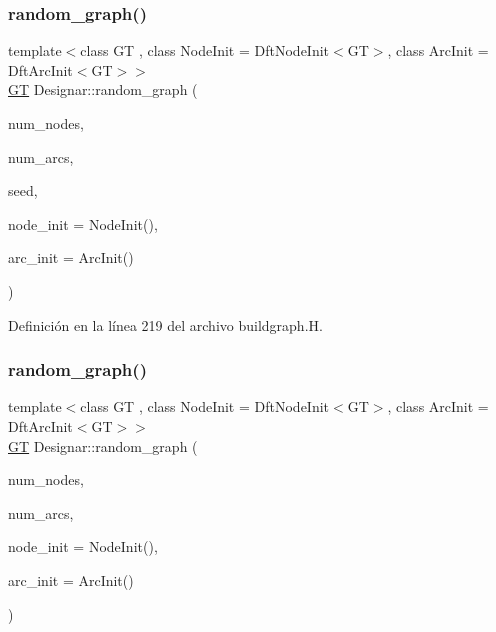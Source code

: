 \subsubsection{\texorpdfstring{random\+\_\+graph()}{random\_graph()}\hspace{0.1cm}{\footnotesize\ttfamily [2/3]}}
{\footnotesize\ttfamily template$<$class GT , class Node\+Init  = Dft\+Node\+Init$<$\+G\+T$>$, class Arc\+Init  = Dft\+Arc\+Init$<$\+G\+T$>$$>$ \\
\hyperlink{demo-buildgraph_8_c_a3001c40d2c31ca87ed96cd7d1334a55e}{GT} Designar\+::random\+\_\+graph (\begin{DoxyParamCaption}\item[{\hyperlink{namespace_designar_aa72662848b9f4815e7bf31a7cf3e33d1}{nat\+\_\+t}}]{num\+\_\+nodes,  }\item[{\hyperlink{namespace_designar_aa72662848b9f4815e7bf31a7cf3e33d1}{nat\+\_\+t}}]{num\+\_\+arcs,  }\item[{\hyperlink{namespace_designar_ad621b5646d45288c5d6a1e1dfe7531a8}{rng\+\_\+seed\+\_\+t}}]{seed,  }\item[{Node\+Init \&\&}]{node\+\_\+init = {\ttfamily NodeInit()},  }\item[{Arc\+Init \&\&}]{arc\+\_\+init = {\ttfamily ArcInit()} }\end{DoxyParamCaption})}



Definición en la línea 219 del archivo buildgraph.\+H.

\mbox{\label{namespace_designar_ad7f5900a4d30c7e30bd22ca58ce5aa0f}} 
\subsubsection{\texorpdfstring{random\+\_\+graph()}{random\_graph()}\hspace{0.1cm}{\footnotesize\ttfamily [3/3]}}
{\footnotesize\ttfamily template$<$class GT , class Node\+Init  = Dft\+Node\+Init$<$\+G\+T$>$, class Arc\+Init  = Dft\+Arc\+Init$<$\+G\+T$>$$>$ \\
\hyperlink{demo-buildgraph_8_c_a3001c40d2c31ca87ed96cd7d1334a55e}{GT} Designar\+::random\+\_\+graph (\begin{DoxyParamCaption}\item[{\hyperlink{namespace_designar_aa72662848b9f4815e7bf31a7cf3e33d1}{nat\+\_\+t}}]{num\+\_\+nodes,  }\item[{\hyperlink{namespace_designar_aa72662848b9f4815e7bf31a7cf3e33d1}{nat\+\_\+t}}]{num\+\_\+arcs,  }\item[{Node\+Init \&\&}]{node\+\_\+init = {\ttfamily NodeInit()},  }\item[{Arc\+Init \&\&}]{arc\+\_\+init = {\ttfamily ArcInit()} }\end{DoxyParamCaption})}



